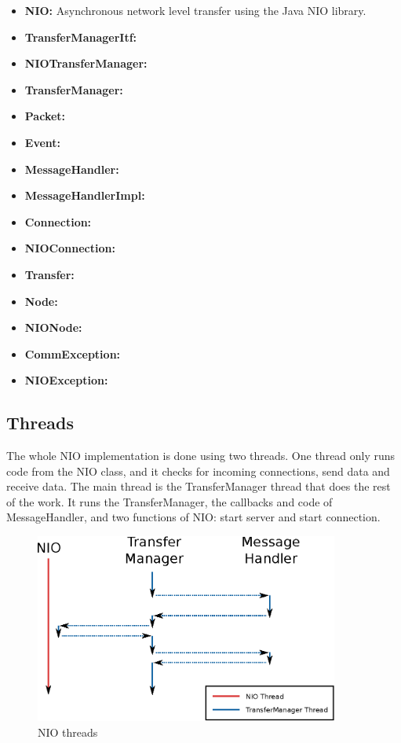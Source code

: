 \documentclass[11pt]{article}
\begin{document}
	\begin{itemize}
		\item \textbf{NIO:}
			Asynchronous network level transfer using the Java NIO library.
		\item \textbf{TransferManagerItf:}
			
		\item \textbf{NIOTransferManager:}
			
		\item \textbf{TransferManager:}
			
		\item \textbf{Packet:}
			
		\item \textbf{Event:}
			
		\item \textbf{MessageHandler:}
			
		\item \textbf{MessageHandlerImpl:}
			
		\item \textbf{Connection:}
			
		\item \textbf{NIOConnection:}
			
		\item \textbf{Transfer:}
			
		\item \textbf{Node:}
			
		\item \textbf{NIONode:}
			
		\item \textbf{CommException:}
			
		\item \textbf{NIOException:}
			

		\end{itemize}

	\subsection{Threads}
	The whole NIO implementation is done using two threads. One thread only runs code from the NIO class, and it checks for incoming connections, send data and receive data. The main thread is the TransferManager thread that does the rest of the work. It runs the TransferManager, the callbacks and code of MessageHandler, and two functions of NIO: start server and start connection.
		\begin{figure}[H]
		\centering
		\includegraphics[width=100mm]{img/drawing2.eps}
		\caption[NIO threads]{NIO threads}
		\label{drawing2}
\end{figure}
		
\end{document}
